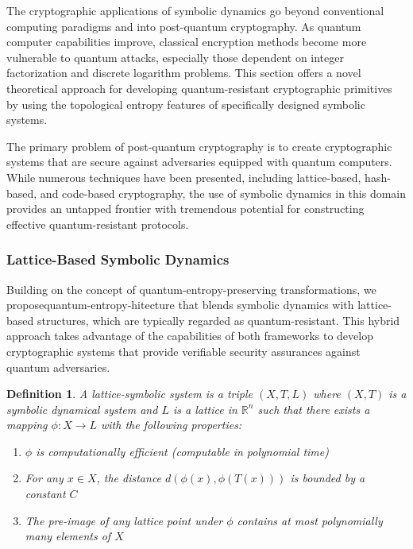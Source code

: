 \documentclass[12pt,a4paper]{article}
\newtheorem{definition}{Definition}
\begin{document}
The cryptographic applications of symbolic dynamics go beyond conventional computing paradigms and into post-quantum cryptography.  As quantum computer capabilities improve, classical encryption methods become more vulnerable to quantum attacks, especially those dependent on integer factorization and discrete logarithm problems.  This section offers a novel theoretical approach for developing quantum-resistant cryptographic primitives by using the topological entropy features of specifically designed symbolic systems.

 The primary problem of post-quantum cryptography is to create cryptographic systems that are secure against adversaries equipped with quantum computers.  While numerous techniques have been presented, including lattice-based, hash-based, and code-based cryptography, the use of symbolic dynamics in this domain provides an untapped frontier with tremendous potential for constructing effective quantum-resistant protocols.
\subsubsection{Lattice-Based Symbolic Dynamics}

Building on the concept of quantum-entropy-preserving transformations, we proposequantum-entropy-hitecture that blends symbolic dynamics with lattice-based structures, which are typically regarded as quantum-resistant.  This hybrid approach takes advantage of the capabilities of both frameworks to develop cryptographic systems that provide verifiable security assurances against quantum adversaries.

 \begin{definition}
 A \textit{lattice-symbolic system} is a triple $(X, T, L)$ where $(X, T)$ is a symbolic dynamical system and $L$ is a lattice in $\mathbb{R}^n$ such that there exists a mapping $\phi: X \rightarrow L$ with the following properties:
 
\begin{enumerate}
\item $\phi$ is computationally efficient (computable in polynomial time)
\item For any $x \in X$, the distance $d(\phi(x), \phi(T(x)))$ is bounded by a constant $C$
\item The pre-image of any lattice point under $\phi$ contains at most polynomially many elements of $X$
\end{enumerate}
\end{definition}
\end{document}
